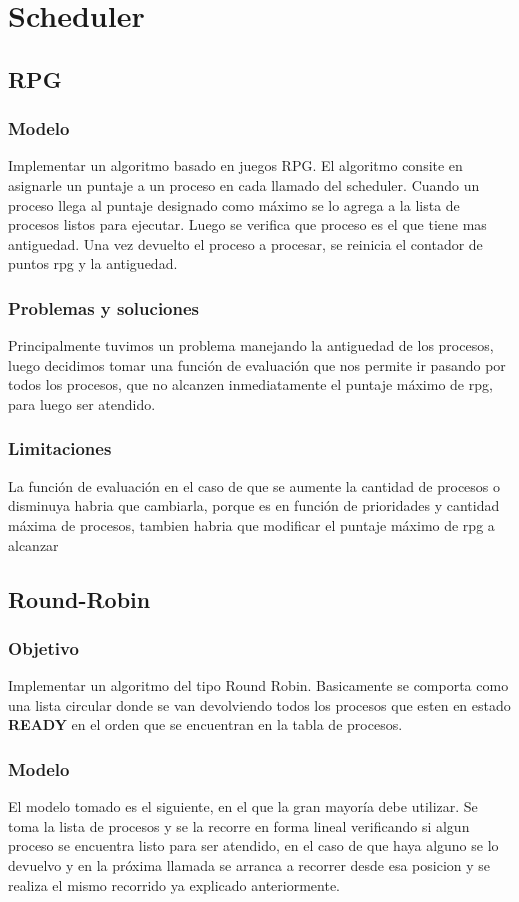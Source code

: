 \documentclass[10pt,a4paper]{article}
\begin{document}
\section{Scheduler}
	\subsection{RPG}
	\subsubsection{Modelo}
		Implementar un algoritmo basado en juegos RPG. El algoritmo consite en asignarle un puntaje a un proceso en cada llamado del scheduler. Cuando un proceso llega al puntaje designado como m\'aximo se lo agrega a la lista de procesos listos para ejecutar. Luego se verifica que proceso es el que tiene mas antiguedad. Una vez devuelto el proceso a procesar, se reinicia el contador de puntos rpg y la antiguedad.
	\subsubsection{Problemas y soluciones}
		Principalmente tuvimos un problema manejando la antiguedad de los procesos, luego decidimos tomar una funci\'on de evaluaci\'on que nos permite ir pasando por todos los procesos, que no alcanzen inmediatamente el puntaje m\'aximo de rpg, para luego ser atendido.
	\subsubsection{Limitaciones}
		La funci\'on de evaluaci\'on en el caso de que se aumente la cantidad de procesos o disminuya habria que cambiarla, porque es en funci\'on de prioridades y cantidad m\'axima de procesos, tambien habria que modificar el puntaje m\'aximo de rpg a alcanzar

\subsection{Round-Robin}
	\subsubsection{Objetivo}
		Implementar un algoritmo del tipo Round Robin. Basicamente se comporta como una lista circular donde se van devolviendo todos los procesos que esten en estado \textbf{READY} en el orden que se encuentran en la tabla de procesos.
	\subsubsection{Modelo}
		El modelo tomado es el siguiente, en el que la gran mayor\'ia debe utilizar. Se toma la lista de procesos y se la recorre en forma lineal verificando si algun proceso se encuentra listo para ser atendido, en el caso de que haya alguno se lo devuelvo y en la pr\'oxima llamada se arranca a recorrer desde esa posicion y se realiza el mismo recorrido ya explicado anteriormente.
\end{document}
